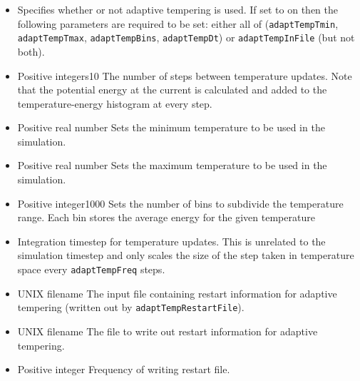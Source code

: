 \begin{itemize}

\item
{}
{Specifies whether or not adaptive tempering is used. If set to on then the following parameters are required to be set: either all of ({\tt adaptTempTmin}, {\tt adaptTempTmax}, {\tt adaptTempBins}, {\tt adaptTempDt}) or {\tt adaptTempInFile} (but not both).
}

\item
{}
{Positive integers}{10}
{The number of steps between temperature updates. Note that the potential energy at the current is calculated and added to the temperature-energy histogram at every step.
}

\item
{}
{Positive real number} 
{Sets the minimum temperature to be used in the simulation.
}

\item
{}
{Positive real number}
{Sets the maximum temperature to be used in the simulation.
}

\item
{}
{Positive integer}{1000}
{Sets the number of bins to subdivide the temperature range. Each bin stores the average energy for the given temperature 
}

\item
{}
{Integration timestep for temperature updates. This is unrelated to the simulation timestep and only scales the size of the step taken in temperature space every {\tt adaptTempFreq} steps.
}

\item
{}
{UNIX filename}
{The input file containing restart information for adaptive tempering (written out by {\tt adaptTempRestartFile}).
}

\item
{}
{UNIX filename}
{The file to write out restart information for adaptive tempering.
}

\item
{}
{Positive integer}
{Frequency of writing restart file.
}


\end{itemize}
